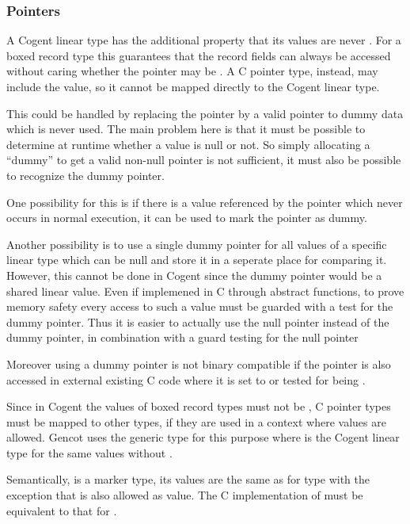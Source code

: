 \subsubsection{ Pointers}

A Cogent linear type has the additional property that its values are never . For a boxed record type this
guarantees that the record fields can always be accessed without caring whether the pointer may be .
A C pointer type, instead, may include the  value, so it cannot be mapped directly to the Cogent linear type.

This could be handled by replacing the  pointer by a valid pointer to dummy data which is never used.
The main problem here is that it must be possible to determine at runtime whether a value is null or not. So simply
allocating a ``dummy'' to get a valid non-null pointer is not sufficient, it must also be possible to recognize the 
dummy pointer.

One possibility for this is if there is a value referenced by the pointer which never occurs in normal execution,
it can be used to mark the pointer as dummy. 

Another possibility is to use a single dummy pointer for all values of a specific linear type which can be null and store it 
in a seperate place for comparing it. However, this cannot be done in Cogent since the dummy pointer would be a shared linear 
value. Even if implemened in C through abstract functions, to prove memory safety every access to such a value must 
be guarded with a test for the dummy pointer. Thus it is easier to actually use the null pointer instead of the dummy pointer,
in combination with a guard testing for the null pointer

Moreover using a dummy pointer is not binary compatible if the pointer is also accessed in external existing C code where 
it is set to  or tested for being .

Since in Cogent the values of boxed record types must not be , C pointer types must be mapped to other types, if 
they are used in a context where  values are allowed. Gencot uses the generic type  for this purpose
where  is the Cogent linear type for the same values without .

Semantically,  is a marker type, its values are the same as for type  with the exception that 
 is also allowed as value. The C implementation of  must be equivalent to that for .

